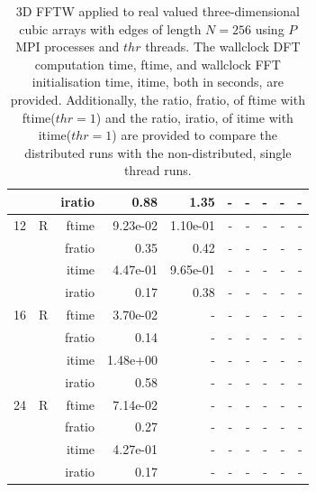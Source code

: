 \documentclass[a4paper]{article}
\begin{document}
\begin{table}[htbp]
\begin{center}
\begin{small}
\begin{tabular}{|r|r|r|r|r|r|r|r|r|r|}
          &      & iratio & 0.88 & 1.35 &     -     &     -     &     -     &     -     &     -     \\ \hline 
     12 & R & ftime & 9.23e-02 & 1.10e-01 &     -     &     -     &     -     &     -     &     -     \\   
          &      & fratio & 0.35 & 0.42 &     -     &     -     &     -     &     -     &     -     \\   
          &      & itime & 4.47e-01 & 9.65e-01 &     -     &     -     &     -     &     -     &     -     \\   
          &      & iratio & 0.17 & 0.38 &     -     &     -     &     -     &     -     &     -     \\ \hline 
     16 & R & ftime & 3.70e-02 &     -     &     -     &     -     &     -     &     -     &     -     \\   
          &      & fratio & 0.14 &     -     &     -     &     -     &     -     &     -     &     -     \\   
          &      & itime & 1.48e+00 &     -     &     -     &     -     &     -     &     -     &     -     \\   
          &      & iratio & 0.58 &     -     &     -     &     -     &     -     &     -     &     -     \\ \hline 
     24 & R & ftime & 7.14e-02 &     -     &     -     &     -     &     -     &     -     &     -     \\   
          &      & fratio & 0.27 &     -     &     -     &     -     &     -     &     -     &     -     \\   
          &      & itime & 4.27e-01 &     -     &     -     &     -     &     -     &     -     &     -     \\   
          &      & iratio & 0.17 &     -     &     -     &     -     &     -     &     -     &     -     \\ \hline 
\end{tabular}
\caption{3D FFTW applied to real valued three-dimensional cubic arrays with edges of length $N=256$ using $P$ MPI processes and $thr$ threads. The wallclock DFT computation time, ftime, and wallclock FFT initialisation time, itime, both in seconds, are provided. Additionally, the ratio, fratio, of ftime  with ftime($thr=1$) and the ratio, iratio, of itime  with itime($thr=1$) are provided to compare the distributed runs with the non-distributed, single thread runs.  }\label{TblFFTW3d256}
\end{small}
\end{center}
\end{table}
\end{document}
